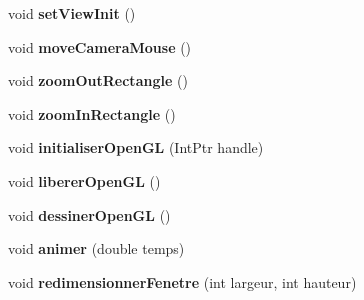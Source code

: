 \begin{DoxyCompactItemize}
\item 
\hypertarget{class_interface_graphique_1_1_engine_a57721ea5517a67c6f051120eb0807c9b}{void {\bfseries set\-View\-Init} ()}\label{class_interface_graphique_1_1_engine_a57721ea5517a67c6f051120eb0807c9b}

\item 
\hypertarget{class_interface_graphique_1_1_engine_a541c191ef2d8df168d7a39afbaa57886}{void {\bfseries move\-Camera\-Mouse} ()}\label{class_interface_graphique_1_1_engine_a541c191ef2d8df168d7a39afbaa57886}

\item 
\hypertarget{class_interface_graphique_1_1_engine_a45950feca3f12fb017f561672375a9ac}{void {\bfseries zoom\-Out\-Rectangle} ()}\label{class_interface_graphique_1_1_engine_a45950feca3f12fb017f561672375a9ac}

\item 
\hypertarget{class_interface_graphique_1_1_engine_ad7cdab0d23d83bdb1b1cdf65ca81db44}{void {\bfseries zoom\-In\-Rectangle} ()}\label{class_interface_graphique_1_1_engine_ad7cdab0d23d83bdb1b1cdf65ca81db44}

\item 
\hypertarget{class_interface_graphique_1_1_engine_ac41c680c622de10310d537685176f928}{void {\bfseries initialiser\-Open\-G\-L} (Int\-Ptr handle)}\label{class_interface_graphique_1_1_engine_ac41c680c622de10310d537685176f928}

\item 
\hypertarget{class_interface_graphique_1_1_engine_aa2c408b58d67781eb20456af83618bc6}{void {\bfseries liberer\-Open\-G\-L} ()}\label{class_interface_graphique_1_1_engine_aa2c408b58d67781eb20456af83618bc6}

\item 
\hypertarget{class_interface_graphique_1_1_engine_a410386c23afb65df2439abe7ec22849e}{void {\bfseries dessiner\-Open\-G\-L} ()}\label{class_interface_graphique_1_1_engine_a410386c23afb65df2439abe7ec22849e}

\item 
\hypertarget{class_interface_graphique_1_1_engine_a019dcdf567b73bd2175626c488e55ef9}{void {\bfseries animer} (double temps)}\label{class_interface_graphique_1_1_engine_a019dcdf567b73bd2175626c488e55ef9}

\item 
\hypertarget{class_interface_graphique_1_1_engine_af07a43b62c37b3eb2809c0ceb168990e}{void {\bfseries redimensionner\-Fenetre} (int largeur, int hauteur)}\label{class_interface_graphique_1_1_engine_af07a43b62c37b3eb2809c0ceb168990e}


\end{DoxyCompactItemize}
